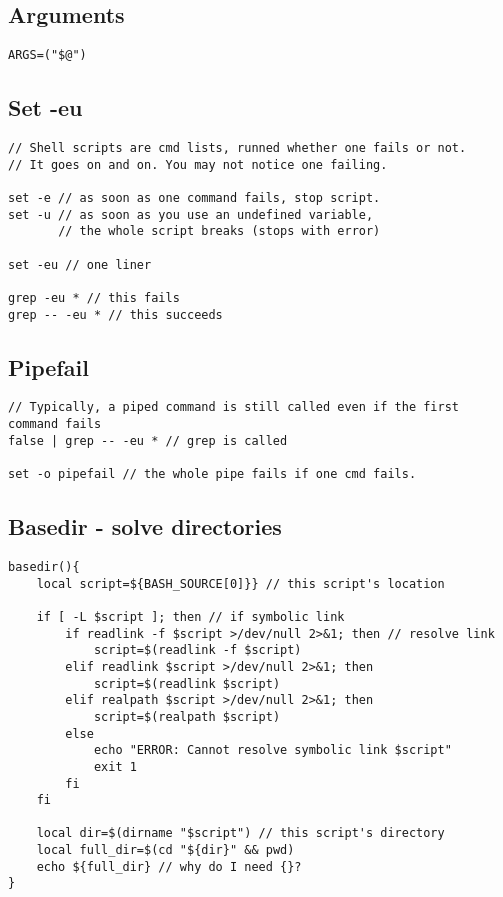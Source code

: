 \subsection{Arguments}

\begin{verbatim}
ARGS=("$@")
\end{verbatim}

\subsection{Set -eu}

\begin{verbatim}
// Shell scripts are cmd lists, runned whether one fails or not.
// It goes on and on. You may not notice one failing. 

set -e // as soon as one command fails, stop script. 
set -u // as soon as you use an undefined variable, 
       // the whole script breaks (stops with error)

set -eu // one liner

grep -eu * // this fails
grep -- -eu * // this succeeds
\end{verbatim}

\subsection{Pipefail}

\begin{verbatim}
// Typically, a piped command is still called even if the first command fails
false | grep -- -eu * // grep is called

set -o pipefail // the whole pipe fails if one cmd fails. 
\end{verbatim}

\subsection{Basedir - solve directories}

\begin{verbatim}
basedir(){
    local script=${BASH_SOURCE[0]}} // this script's location

    if [ -L $script ]; then // if symbolic link
        if readlink -f $script >/dev/null 2>&1; then // resolve link
            script=$(readlink -f $script)
        elif readlink $script >/dev/null 2>&1; then
            script=$(readlink $script)
        elif realpath $script >/dev/null 2>&1; then
            script=$(realpath $script)
        else
            echo "ERROR: Cannot resolve symbolic link $script"
            exit 1 
        fi
    fi

    local dir=$(dirname "$script") // this script's directory
    local full_dir=$(cd "${dir}" && pwd)
    echo ${full_dir} // why do I need {}?
}
\end{verbatim}

